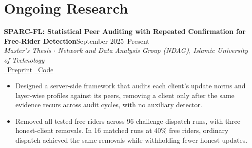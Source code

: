 \documentclass[10pt,letterpaper]{article}
\newcommand{\entry}[3]{%
    \textbf{#1}\hfill #2\\[-1pt]
    #3
}
\newenvironment{cvitems}{%
    \begin{itemize}[
        leftmargin=13pt,
        topsep=2pt,
        itemsep=1pt,
        parsep=0pt,
        partopsep=0pt
    ]
}{\end{itemize}}
\begin{document}
\section{Ongoing Research}
\entry{SPARC-FL: Statistical Peer Auditing with Repeated Confirmation for Free-Rider Detection}{September 2025--Present}{%
    \textit{Master's Thesis $\cdot$ Network and Data Analysis Group (NDAG), Islamic University of Technology}\\[-1pt]
    \href{https://aashnan-rahman.github.io/academic-profile/Resources/Masters/masters_paper.pdf}{\faFile\ Preprint}
    \quad \href{https://github.com/Aashnan-Rahman/Mitigating-Free-Rider}{\faGithub\ Code}\\[-1pt]
    \begin{cvitems}
        \item Designed a server-side framework that audits each client's update norms and layer-wise profiles against its peers, removing a client only after the same evidence recurs across audit cycles, with no auxiliary detector.
        \item Removed all tested free riders across 96 challenge-dispatch runs, with three honest-client removals. In 16 matched runs at 40\% free riders, ordinary dispatch achieved the same removals while withholding fewer honest updates.
    \end{cvitems}
}
\end{document}
